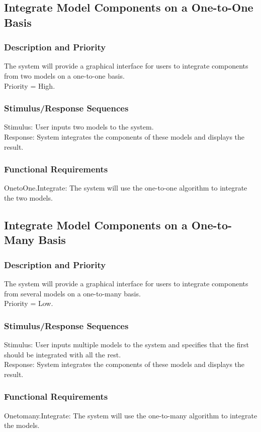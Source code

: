 \documentclass{article}
\begin{document}
\subsection{Integrate Model Components on a One-to-One Basis}
\subsubsection{Description and Priority}
The system will provide a graphical interface for users to integrate components from two models on a one-to-one basis.\\
Priority = High.

\subsubsection{Stimulus/Response Sequences}
Stimulus: User inputs two models to the system.\\
Response: System integrates the components of these models and displays the result.

\subsubsection{Functional Requirements}
OnetoOne.Integrate: The system will use the one-to-one algorithm to integrate the two models.

\subsection{Integrate Model Components on a One-to-Many Basis}
\subsubsection{Description and Priority}
The system will provide a graphical interface for users to integrate components from several models on a one-to-many basis.\\
Priority = Low.

\subsubsection{Stimulus/Response Sequences}
Stimulus: User inputs multiple models to the system and specifies that the first should be integrated with all the rest.\\
Response: System integrates the components of these models and displays the result.

\subsubsection{Functional Requirements}
Onetomany.Integrate: The system will use the one-to-many algorithm to integrate the models.
\end{document}
